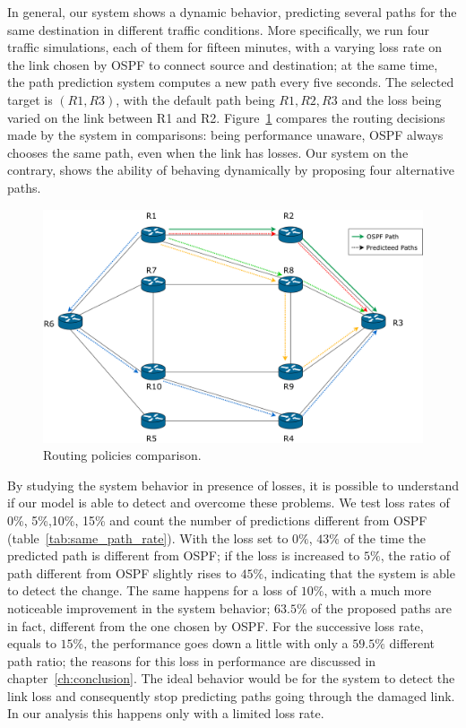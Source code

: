 In general, our system shows a dynamic behavior, predicting several paths for the same destination in different traffic conditions. More specifically, we run four traffic simulations, each of them for fifteen minutes, with a varying loss rate on the link chosen by OSPF to connect source and destination;  at the same time, the path prediction system computes a new path every five seconds. The selected target is $(R1, R3)$, with the default path being $R1,R2,R3$ and the loss being varied on the link between R1 and R2. Figure~\ref{fig:path_cmp} compares the routing decisions made by the system in comparisons: being performance unaware, OSPF always chooses the same path, even when the link has losses. Our system on the contrary, shows the ability of behaving dynamically by proposing four alternative paths.

\begin{figure}[]
\centering
\includegraphics[width=.97\textwidth]{img/path_comparison}
\caption{Routing policies comparison.}
\label{fig:path_cmp}
\end{figure}
By studying the system behavior in presence of losses, it is possible to understand if our model is able to detect and overcome these problems. We test loss rates of 0\%, 5\%,10\%, 15\% and count the number of predictions different from OSPF (table~\ref{tab:same_path_rate}). With the loss set to $0\%$, $43\%$ of the time the predicted path is different from OSPF; if the loss is increased to $5\%$, the ratio of path different from OSPF slightly rises to $45\%$, indicating that the system is able to detect the change. The same happens for a loss of $10\%$, with a much more noticeable improvement in the system behavior;  $63.5\%$ of the proposed paths are in fact, different from the one chosen by OSPF. For the successive loss rate, equals to $15\%$, the performance goes down a little with only a $59.5\%$ different path ratio; the reasons for this loss in performance are discussed in chapter~\ref{ch:conclusion}. The ideal behavior would be for the system to detect the link loss and consequently stop predicting paths going through the damaged link. In our analysis this happens only with a limited loss rate.


